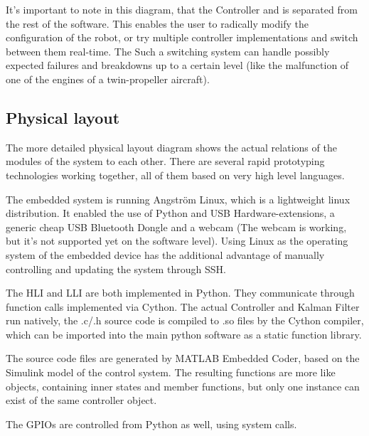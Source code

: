 It’s important to note in this diagram, that the Controller and is separated from the rest of the software. This enables the user to radically modify the configuration of the robot, or try multiple controller implementations and switch between them real-time. The 
Such a switching system can handle possibly expected failures and breakdowns up to a certain level (like the malfunction of one of the engines of a twin-propeller aircraft).

\subsection{Physical layout}

The more detailed physical layout diagram shows the actual relations of the modules of the system to each other. There are several rapid prototyping technologies working together, all of them based on very high level languages.

The embedded system is running Angström Linux, which is a lightweight linux distribution. It enabled the use of Python and USB Hardware-extensions, a generic cheap USB Bluetooth Dongle and a webcam (The webcam is working, but it’s not supported yet on the software level).
Using Linux as the operating system of the embedded device has the additional advantage of manually controlling and updating the system through SSH.

The HLI and LLI are both implemented in Python. They communicate through function calls implemented via Cython. The actual Controller and Kalman Filter run natively, the .c/.h source code is compiled to .so files by the Cython compiler, which can be imported into the main python software as a static function library.

The source code files are generated by MATLAB Embedded Coder, based on the Simulink model of the control system. The resulting functions are more like objects, containing inner states and member functions, but only one instance can exist of the same controller object.

The GPIOs are controlled from Python as well, using system calls.

